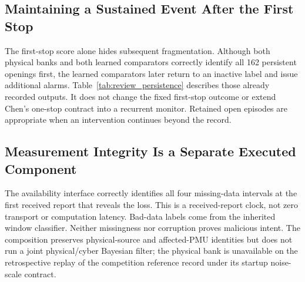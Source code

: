 


\subsection{Maintaining a Sustained Event After the First Stop}
The first-stop score alone hides subsequent fragmentation. Although both
physical banks and both learned comparators correctly identify all 162
persistent openings first, the learned comparators later return to an
inactive label and issue additional alarms. Table~\ref{tab:review_persistence}
describes those already recorded outputs. It does not change the fixed
first-stop outcome or extend Chen's one-stop contract into a recurrent
monitor. Retained open episodes are appropriate when an intervention
continues beyond the record.


\subsection{Measurement Integrity Is a Separate Executed Component}

The availability interface correctly identifies all four missing-data
intervals at the first received report that reveals the loss. This is a
received-report clock, not zero transport or computation latency.
Bad-data labels come from the inherited window classifier. Neither
missingness nor corruption proves malicious intent. The composition
preserves physical-source and affected-PMU identities but does not run a
joint physical/cyber Bayesian filter; the physical bank is unavailable on
the retrospective replay of the competition reference record under its startup noise-scale contract.

\FloatBarrier
